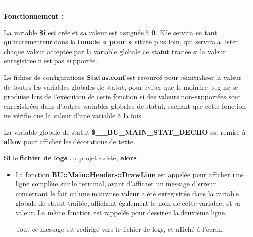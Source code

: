 \documentclass[a4paper,10pt]{article}
\begin{document}
\par\noindent\rule{\textwidth}{0.4pt}

\begin{justify}
    \textbf{Fonctionnement :}

    La variable \textbf{\color{vars}\$i} est crée et sa valeur est assignée à \textbf{0}. Elle servira en tant qu'incrémenteur dans la \textbf{\color{loop}boucle « pour »} située plus loin, qui servira à lister chaque valeur acceptée par la variable globale de statut traitée si la valeur enregistrée n'est pas supportée.
\end{justify}

\setlength{\parskip}{2em}

\begin{justify}
    Le fichier de configurations \textbf{\color{path}Status.conf} est resourcé pour réinitialiser la valeur de toutes les variables globales de statut, pour éviter que le moindre bug ne se produise lors de l'exécution de cette fonction si des valeurs non-supportées sont enregistrées dans d'autres variables globales de statut, sachant que cette fonction ne vérifie que la valeur d'une variable à la fois.
\end{justify}

\setlength{\parskip}{1em}

\begin{justify}
    La variable globale de statut \textbf{\color{vars}\$\_\_BU\_MAIN\_STAT\_DECHO} est remise à \textbf{allow} pour afficher les décorations de texte.
\end{justify}

\setlength{\parskip}{2em}

\begin{justify}
    \textbf{\color{cond}Si} le \textbf{\color{path}fichier de logs} du projet existe, \textbf{\color{cond}alors} :

    \setlength{\parskip}{1em}

    \begin{itemize}
        \item
        {
            \begin{justify}
                La fonction \textbf{\color{func}BU::Main::Headers::DrawLine} est appelée pour afficher une ligne complète sur le terminal, avant d'afficher un message d'erreur concernant le fait qu'une mauvaise valeur a été enregistrée dans la variable globale de statut traitée, affichant également le nom de cette variable, et sa valeur. La même fonction est rappelée pour dessiner la deuxième ligne.
            \end{justify}

            \setlength{\parskip}{1em}

            \begin{justify}
                Tout ce message est redirigé vers le fichier de logs, et affiché à l'écran.
            \end{justify}
        }
    \end{itemize}
\end{justify}
\end{document}
